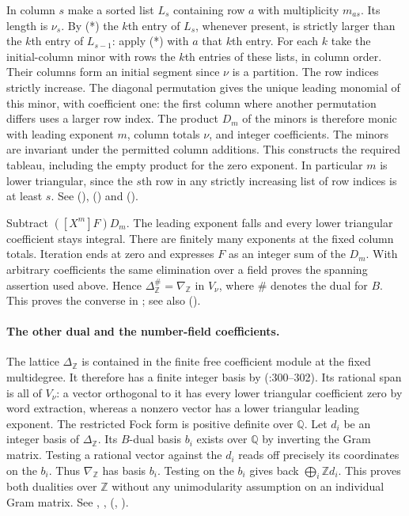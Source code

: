 In column $s$ make a sorted list $L_s$ containing row $a$ with
multiplicity $m_{as}$. Its length is $\nu_s$. By (*) the $k$th entry
of $L_s$, whenever present, is strictly larger than the $k$th entry
of $L_{s-1}$: apply (*) with $a$ that $k$th entry. For each $k$ take
the initial-column minor with rows the $k$th entries of these lists,
in column order. Their columns form an initial segment since $\nu$ is
a partition. The row indices strictly increase. The diagonal
permutation gives the unique leading monomial of this minor, with
coefficient one: the first column where another permutation differs
uses a larger row index. The product $D_m$ of the minors is therefore
monic with leading exponent $m$, column totals $\nu$, and integer
coefficients. The minors are invariant under the permitted column
additions. This constructs the required tableau, including the empty
product for the zero exponent. In particular $m$ is lower triangular,
since the $s$th row in any strictly increasing list of row indices
is at least $s$.
See  (),
 () and
().

Subtract $([X^m]F)D_m$. The leading exponent falls and every lower
triangular coefficient stays integral. There are finitely many
exponents at the fixed column totals. Iteration ends at zero and
expresses $F$ as an integer sum of the $D_m$. With arbitrary coefficients
the same elimination over a field proves the spanning assertion used
above. Hence $\Delta_{\mathbb Z}^{\#}=\nabla_{\mathbb Z}$ in
$V_\nu$, where $\#$ denotes the dual for $B$.
This proves the converse in ; see also
().

\paragraph{The other dual and the number-field coefficients.}
The lattice $\Delta_{\mathbb Z}$ is contained in the finite free
coefficient module at the fixed multidegree. It therefore has a finite
integer basis by 
(:300--302).
Its rational span is all of $V_\nu$: a vector
orthogonal to it has every lower triangular coefficient zero by word
extraction, whereas a nonzero vector has a lower triangular leading
exponent. The restricted Fock form is positive definite over $\mathbb Q$.
Let $d_i$ be an integer basis of $\Delta_{\mathbb Z}$. Its
$B$-dual basis $b_i$ exists over $\mathbb Q$ by inverting the Gram
matrix. Testing a rational vector against the $d_i$ reads off precisely
its coordinates on the $b_i$. Thus $\nabla_{\mathbb Z}$ has basis
$b_i$. Testing on the $b_i$ gives back $\bigoplus_i\mathbb Z d_i$.
This proves both dualities over $\mathbb Z$ without any unimodularity
assumption on an individual Gram matrix. See ,
, 
(,
).

